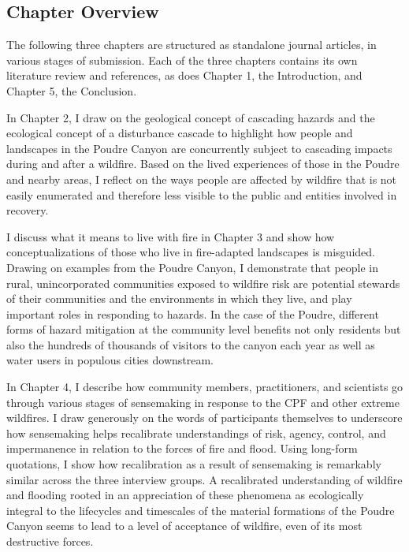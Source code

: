 \documentclass[
]{article}
\begin{document}
\subsection{Chapter Overview}\label{chapter-overview}

The following three chapters are structured as standalone journal articles, in various stages of submission. Each of the three chapters contains its own literature review and references, as does Chapter 1, the Introduction, and Chapter 5, the Conclusion.

In Chapter 2, I draw on the geological concept of cascading hazards and the ecological concept of a disturbance cascade to highlight how people and landscapes in the Poudre Canyon are concurrently subject to cascading impacts during and after a wildfire. Based on the lived experiences of those in the Poudre and nearby areas, I reflect on the ways people are affected by wildfire that is not easily enumerated and therefore less visible to the public and entities involved in recovery.

I discuss what it means to live with fire in Chapter 3 and show how conceptualizations of those who live in fire-adapted landscapes is misguided. Drawing on examples from the Poudre Canyon, I demonstrate that people in rural, unincorporated communities exposed to wildfire risk are potential stewards of their communities and the environments in which they live, and play important roles in responding to hazards. In the case of the Poudre, different forms of hazard mitigation at the community level benefits not only residents but also the hundreds of thousands of visitors to the canyon each year as well as water users in populous cities downstream.

In Chapter 4, I describe how community members, practitioners, and scientists go through various stages of sensemaking in response to the CPF and other extreme wildfires. I draw generously on the words of participants themselves to underscore how sensemaking helps recalibrate understandings of risk, agency, control, and impermanence in relation to the forces of fire and flood. Using long-form quotations, I show how recalibration as a result of sensemaking is remarkably similar across the three interview groups. A recalibrated understanding of wildfire and flooding rooted in an appreciation of these phenomena as ecologically integral to the lifecycles and timescales of the material formations of the Poudre Canyon seems to lead to a level of acceptance of wildfire, even of its most destructive forces.
\end{document}
